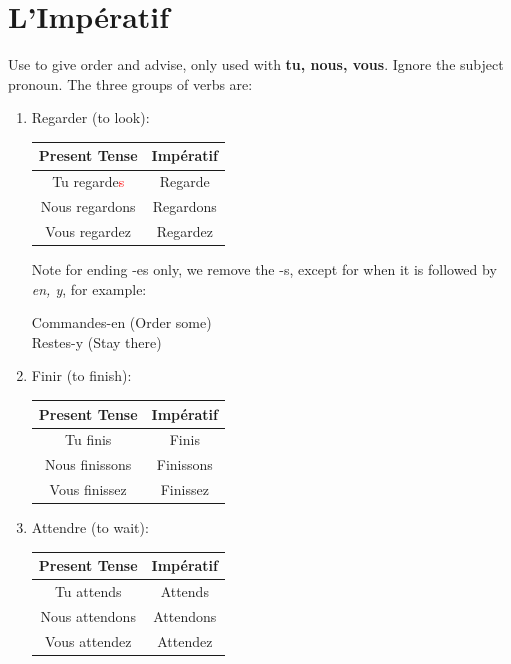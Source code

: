 \documentclass{book}
\begin{document}
\chapter{L'Impératif}
Use to give order and advise, only used with \textbf{tu, nous, vous}. Ignore the subject pronoun. 
The three groups of verbs are:
\begin{enumerate}
    \item Regarder (to look):
    \begin{center}
        \begin{tabular}{|c|c|}
            \hline
            \textbf{Present Tense} & \textbf{Impératif} \\
            \hline
            Tu regarde\textcolor{red}{s} & Regarde \\
            \hline
            Nous regardons & Regardons \\
            \hline
            Vous regardez & Regardez \\
            \hline
        \end{tabular}
    \end{center}
    Note for ending -es only, we remove the -s, except for when it is followed by \textit{en, y}, for example:
    \begin{center}
        Commandes-en (Order some) \\
        Restes-y (Stay there)
    \end{center}
    
    \item Finir (to finish):
    \begin{center}
        \begin{tabular}{|c|c|}
            \hline
            \textbf{Present Tense} & \textbf{Impératif} \\
            \hline
            Tu finis & Finis \\
            \hline
            Nous finissons & Finissons \\
            \hline
            Vous finissez & Finissez \\
            \hline
        \end{tabular}
    \end{center}

    \item Attendre (to wait):
    \begin{center}
        \begin{tabular}{|c|c|}
            \hline
            \textbf{Present Tense} & \textbf{Impératif} \\
            \hline
            Tu attends & Attends \\
            \hline
            Nous attendons & Attendons \\
            \hline
            Vous attendez & Attendez \\
            \hline
        \end{tabular}
    \end{center}
\end{enumerate}
\end{document}
